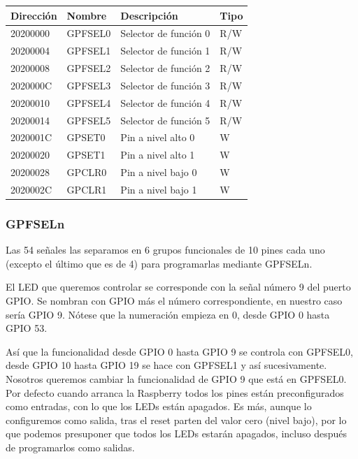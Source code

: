 \begin{table}
\centering
\begin{tabular}{ p{1.8cm} | p{2cm} | p{5cm} | p{1cm} }
{\bf Dirección} & {\bf Nombre} & {\bf Descripción} & {\bf Tipo} \\
\hline
20200000 & GPFSEL0 & Selector de función 0 & R/W \\
20200004 & GPFSEL1 & Selector de función 1 & R/W \\
20200008 & GPFSEL2 & Selector de función 2 & R/W \\
2020000C & GPFSEL3 & Selector de función 3 & R/W \\
20200010 & GPFSEL4 & Selector de función 4 & R/W \\
20200014 & GPFSEL5 & Selector de función 5 & R/W \\
2020001C & GPSET0  & Pin a nivel alto 0 & W   \\
20200020 & GPSET1  & Pin a nivel alto 1 & W   \\
20200028 & GPCLR0  & Pin a nivel bajo 0 & W  \\
2020002C & GPCLR1  & Pin a nivel bajo 1 & W  \\
\end{tabular}
\end{table}


\subsubsection{GPFSELn}

Las 54 señales las separamos en 6
grupos funcionales de 10 pines cada uno (excepto el último
que es de 4) para programarlas mediante GPFSELn.

El LED que queremos controlar se corresponde con la señal número 9 del puerto GPIO.
Se nombran con GPIO más el número correspondiente, en nuestro caso sería GPIO 9. Nótese
que la numeración empieza en 0, desde GPIO 0 hasta GPIO 53.

Así que la funcionalidad desde GPIO 0 hasta GPIO 9 se controla con
GPFSEL0, desde GPIO 10 hasta GPIO 19 se hace con GPFSEL1 y así
sucesivamente. Nosotros queremos cambiar la funcionalidad de GPIO 9
que está en GPFSEL0. Por defecto cuando arranca la Raspberry
todos los pines están preconfigurados como entradas, con lo que los LEDs
están apagados. Es más, aunque lo configuremos como salida, tras el reset
parten del valor cero (nivel bajo), por lo que podemos presuponer que
todos los LEDs estarán apagados, incluso después de programarlos como salidas.

